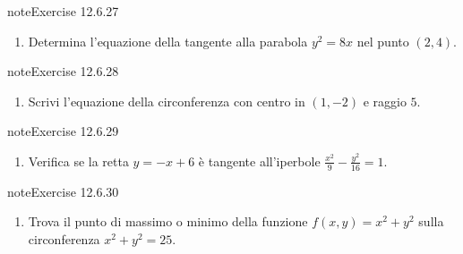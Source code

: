 \documentclass[letterpaper,10pt,italian]{jupyterBook}
\begin{document}
\begin{sphinxadmonition}{note}{Exercise 12.6.27}


\begin{enumerate}
%
\setcounter{enumi}{26}
\item {} 
\sphinxAtStartPar
Determina l’equazione della tangente alla parabola \( y^2 = 8x \) nel punto \( (2, 4) \).

\end{enumerate}
\end{sphinxadmonition}
 \label{exercise:ch/analytic_geometry/analytic_geometry_2d/problems-exercise-27}

\begin{sphinxadmonition}{note}{Exercise 12.6.28}


\begin{enumerate}
%
\setcounter{enumi}{27}
\item {} 
\sphinxAtStartPar
Scrivi l’equazione della circonferenza con centro in \( (1, -2) \) e raggio \( 5 \).

\end{enumerate}
\end{sphinxadmonition}
 \label{exercise:ch/analytic_geometry/analytic_geometry_2d/problems-exercise-28}

\begin{sphinxadmonition}{note}{Exercise 12.6.29}


\begin{enumerate}
%
\setcounter{enumi}{28}
\item {} 
\sphinxAtStartPar
Verifica se la retta \( y = -x + 6 \) è tangente all’iperbole \( \frac{x^2}{9} - \frac{y^2}{16} = 1 \).

\end{enumerate}
\end{sphinxadmonition}
 \label{exercise:ch/analytic_geometry/analytic_geometry_2d/problems-exercise-29}

\begin{sphinxadmonition}{note}{Exercise 12.6.30}


\begin{enumerate}
%
\setcounter{enumi}{29}
\item {} 
\sphinxAtStartPar
Trova il punto di massimo o minimo della funzione \( f(x, y) = x^2 + y^2 \) sulla circonferenza \( x^2 + y^2 = 25 \).

\end{enumerate}
\end{sphinxadmonition}
\end{document}
